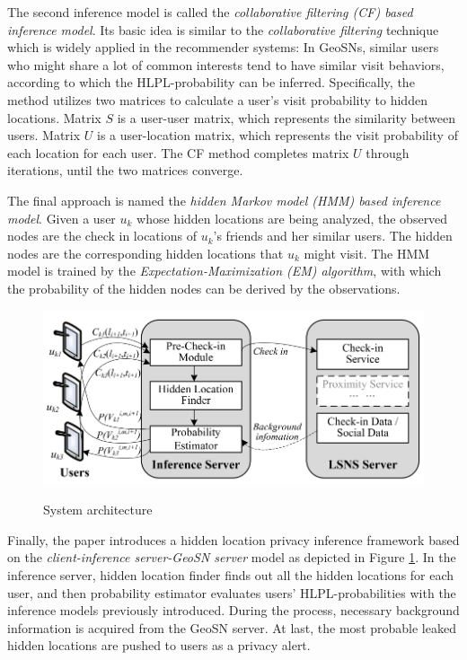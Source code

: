 \documentclass[paper=a4, fontsize=18pt]{article} %
\numberwithin{equation}{section} %
\numberwithin{figure}{section} %
\numberwithin{table}{section} %
\begin{document}
The second inference model is called the \emph{collaborative filtering (CF) based inference model}. Its basic idea is similar to the \emph{collaborative filtering} technique which is widely applied in the recommender systems: In GeoSNs, similar users who might share a lot of common interests tend to have similar visit behaviors, according to which the HLPL-probability can be inferred. Specifically, the method utilizes two matrices to calculate a user's visit probability to hidden locations. Matrix $S$ is a user-user matrix, which represents the similarity between users. Matrix $U$ is a user-location matrix, which represents the visit probability of each location for each user. The CF method completes matrix $U$ through iterations, until the two matrices converge.

The final approach is named the \emph{hidden Markov model (HMM) based inference model}. Given a user $u_k$ whose hidden locations are being analyzed, the observed nodes are the check in locations of $u_k$'s friends and her similar users. The hidden nodes are the corresponding hidden locations that $u_k$ might visit. The HMM model is trained by the \emph{Expectation-Maximization (EM) algorithm}, with which the probability of the hidden nodes can be derived by the observations.

\begin{figure}[h]
  \centering
  \includegraphics[width=.6\linewidth]{7_25_checkin_system.png}\\
  \caption{System architecture}\label{fig:checkin_system}
\end{figure}

Finally, the paper introduces a hidden location privacy inference framework based on the \emph{client-inference server-GeoSN server} model as depicted in Figure \ref{fig:checkin_system}. In the inference server, hidden location finder finds out all the hidden locations for each user, and then probability estimator evaluates users' HLPL-probabilities with the inference models previously introduced. During the process, necessary background information is acquired from the GeoSN server. At last, the most probable leaked hidden locations are pushed to users as a privacy alert.
\end{document}
